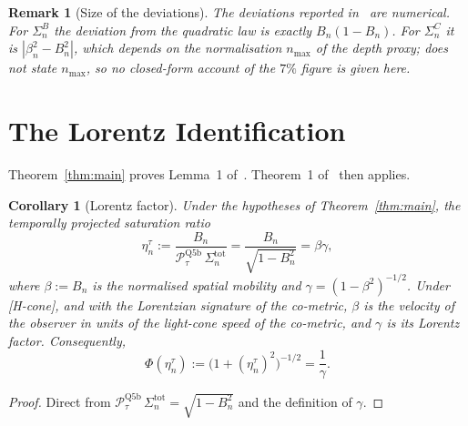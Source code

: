 \documentclass[11pt,a4paper]{article}
\newtheorem{corollary}[theorem]{Corollary}
\newtheorem{remark}[theorem]{Remark}
\begin{document}
      \begin{remark}[Size of the deviations]\label{rem:info}
        The deviations reported in~\cite{Beau2026n} are numerical.
        For $\Sigma_n^B$ the deviation from the quadratic law is exactly $B_n(1-B_n)$.
        For $\Sigma_n^C$ it is $|\beta_n^2 - B_n^2|$, which depends on the normalisation $n_{\max}$ of the depth proxy;
        \cite{Beau2026n} does not state $n_{\max}$, so no closed-form account of the $7\%$ figure is given here.
      \end{remark}

  \section{The Lorentz Identification}\label{sec:lorentz}

    Theorem~\ref{thm:main} proves Lemma~1 of~\cite{Beau2026n}.
    Theorem~1 of~\cite{Beau2026n} then applies.

    \begin{corollary}[Lorentz factor]\label{cor:lorentz}
      Under the hypotheses of Theorem~\ref{thm:main}, the temporally projected saturation ratio
      \[
        \eta_n^\tau := \frac{B_n}{\mathcal{P}_\tau^{\mathrm{Q5b}}\,\Sigma_n^{\mathrm{tot}}}
        = \frac{B_n}{\sqrt{1-B_n^2}} = \beta\gamma,
      \]
      where $\beta := B_n$ is the normalised spatial mobility and $\gamma = (1-\beta^2)^{-1/2}$.
      Under \textup{[H-cone]}, and with the Lorentzian signature of the co-metric, $\beta$ is the velocity of the
      observer in units of the light-cone speed of the co-metric, and $\gamma$ is its Lorentz factor.
      Consequently,
      \[
        \Phi(\eta_n^\tau) := \bigl(1 + (\eta_n^\tau)^2\bigr)^{-1/2} = \frac{1}{\gamma}.
      \]
    \end{corollary}

    \begin{proof}
      Direct from $\mathcal{P}_\tau^{\mathrm{Q5b}}\,\Sigma_n^{\mathrm{tot}} = \sqrt{1-B_n^2}$
      and the definition of $\gamma$.
    \end{proof}
\end{document}
